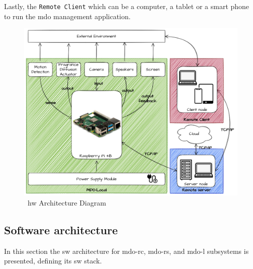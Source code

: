 Lastly, the \texttt{Remote Client} which can be a computer, a tablet or a smart phone to run the \gls{mdo} management application.
%
\begin{figure}
\centering
    \includegraphics[width=0.9\columnwidth]{./img/HW_Architecture.png}
  \caption{~\gls{hw} Architecture Diagram}%
\label{fig:hw-arch}
\end{figure}
%
%
\subsection{Software architecture}
\label{sec:softw-arch}
In this section the \gls{sw} architecture for \gls{mdo-rc}, \gls{mdo-rs}, and
\gls{mdo-l} subsystems is presented, defining its \gls{sw} stack.


